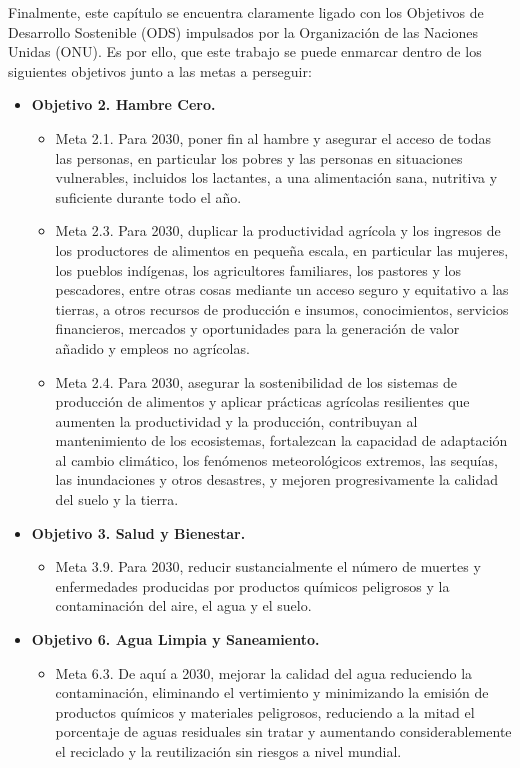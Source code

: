 Finalmente, este capítulo se encuentra claramente ligado con los Objetivos de Desarrollo Sostenible (ODS) impulsados por la Organización de las Naciones Unidas (ONU). Es por ello, que este trabajo se puede enmarcar dentro de los siguientes objetivos junto a las metas a perseguir:

\begin{itemize}
    \item \textbf{Objetivo 2. Hambre Cero.}
    \begin{itemize}
        \item Meta 2.1. Para 2030, poner fin al hambre y asegurar el acceso de todas las personas, en particular los pobres y las personas en situaciones vulnerables, incluidos los lactantes, a una alimentación sana, nutritiva y suficiente durante todo el año.
        \item Meta 2.3. Para 2030, duplicar la productividad agrícola y los ingresos de los productores de alimentos en pequeña escala, en particular las mujeres, los pueblos indígenas, los agricultores familiares, los pastores y los pescadores, entre otras cosas mediante un acceso seguro y equitativo a las tierras, a otros recursos de producción e insumos, conocimientos, servicios financieros, mercados y oportunidades para la generación de valor añadido y empleos no agrícolas.
        \item Meta 2.4. Para 2030, asegurar la sostenibilidad de los sistemas de producción de alimentos y aplicar prácticas agrícolas resilientes que aumenten la productividad y la producción, contribuyan al mantenimiento de los ecosistemas, fortalezcan la capacidad de adaptación al cambio climático, los fenómenos meteorológicos extremos, las sequías, las inundaciones y otros desastres, y mejoren progresivamente la calidad del suelo y la tierra.
    \end{itemize}
    \item \textbf{Objetivo 3. Salud y Bienestar.}
    \begin{itemize}
        \item Meta 3.9. Para 2030, reducir sustancialmente el número de muertes y enfermedades producidas por productos químicos peligrosos y la contaminación del aire, el agua y el suelo.
    \end{itemize}
    \item \textbf{Objetivo 6. Agua Limpia y Saneamiento.}
    \begin{itemize}
        \item Meta 6.3. De aquí a 2030, mejorar la calidad del agua reduciendo la contaminación, eliminando el vertimiento y minimizando la emisión de productos químicos y materiales peligrosos, reduciendo a la mitad el porcentaje de aguas residuales sin tratar y aumentando considerablemente el reciclado y la reutilización sin riesgos a nivel mundial.

\end{itemize}
\end{itemize}
